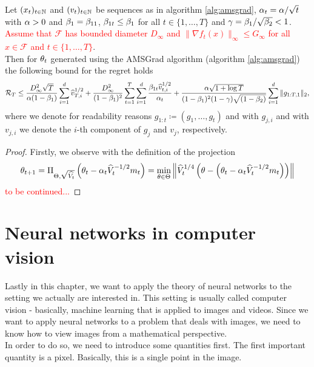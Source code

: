 \begin{theorem}\label{theorem:amsgrad}
Let $(x_t)_{t\in\operatorname{\mathbb{N}}}$ and $(v_t)_{t\in\operatorname{\mathbb{N}}}$ be sequences as in algorithm \ref{alg:amsgrad}, $\alpha_t = \alpha/\sqrt{t}$ with $\alpha>0$ and $\beta_1 = \beta_{11}$, $\beta_{1t}\leq \beta_1$ for all $t \in \{1,\ldots, T\}$ and $\operatorname{\gamma} = \beta_1/\sqrt{\beta_{2}} < 1$. \textcolor{red}{Assume that $\mathcal{F}$ has bounded diameter $D_{\infty}$ and $\|\nabla f_t(x)\|_{\infty}\leq G_{\infty}$ for all $x\in\mathcal{F}$ and $t \in \{1,\ldots, T\}$}.\\
Then for $\theta_t$ generated using the AMSGrad algorithm (algorithm \ref{alg:amsgrad}) the following bound for the regret holds
\begin{align*}
\operatorname{\mathcal{R}}_T \leq \frac{D_{\infty}^2\sqrt{T}}{\alpha(1-\beta_1)} \sum_{i=1}^d \widehat{v}_{T,i}^{1/2} + \frac{D_{\infty}^2}{(1-\beta_1)^2} \sum_{t=1}^T \sum_{i=1}^d \frac{\beta_{1t}\widehat{v}_{t,i}^{1/2}}{\alpha_t}+ \frac{\alpha\sqrt{1 + \log T}}{(1-\beta_1)^2(1-\operatorname{\gamma})\sqrt{(1-\beta_2)}}\sum_{i=1}^d \|g_{1:T,1}\|_2,
\end{align*}
where we denote for readability reasons $g_{1:t}\coloneqq(g_1,\ldots, g_t)$ and with $g_{j,i}$ and with $v_{j,i}$ we denote the $i$-th component of $g_j$ and $v_j$, respectively.
\end{theorem}

\begin{proof}
Firstly, we observe with the definition of the projection
\begin{align*}
\theta_{t+1} = \Pi_{\operatorname{\Theta}, \sqrt{\widehat{V_t}}} \left(\theta_t - \alpha_t \widehat{V}_t^{-1/2}m_t \right) = \min_{\theta \in \operatorname{\Theta}} \left\|\widehat{V}_t^{1/4} \left( \theta -  \left(\theta_t - \alpha_t \widehat{V}_t^{-1/2}m_t \right) \right) \right\|
\end{align*}
\textcolor{red}{to be continued...}
\end{proof}

\section{Neural networks in computer vision}

Lastly in this chapter, we want to apply the theory of neural networks to the setting we actually are interested in. This setting is usually called computer vision - basically, machine learning that is applied to images and videos. Since we want to apply neural networks to a problem that deals with images, we need to know how to view images from a mathematical perspective.\\
In order to do so, we need to introduce some quantities first. The first important quantity is a pixel. Basically, this is a single point in the image.


